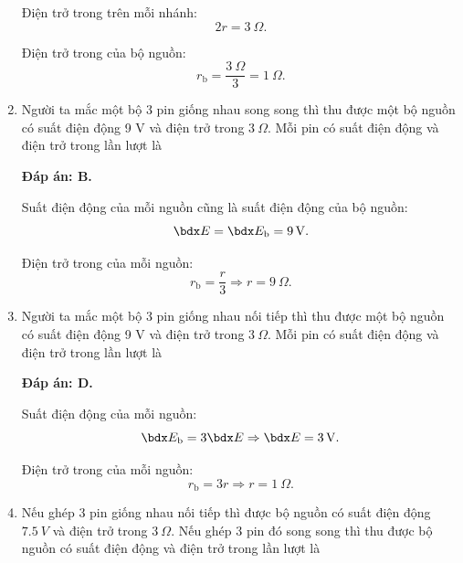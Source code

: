 \begin{enumerate}[label=\bfseries Câu \arabic*:]
{		Điện trở trong trên mỗi nhánh:
		$$2r = \SI{3}{\Omega}.$$
		
		Điện trở trong của bộ nguồn:
		$$r_\text{b} = \dfrac{\SI{3}{\Omega}}{3} = \SI{1}{\Omega}.$$
	}
	\item {}
	
	\cauhoi
	{Người ta mắc một bộ 3 pin giống nhau song song thì thu được một bộ nguồn có suất điện động 9 V và điện trở trong $\SI{3}{\Omega}$. Mỗi pin có suất điện động và điện trở trong lần lượt là
		
	}
	\loigiai
	{	\textbf{Đáp án: B.}
		
		Suất điện động của mỗi nguồn cũng là suất điện động của bộ nguồn:
		$$\calE = \calE_\text b = \SI{9}{V}.$$
		
		Điện trở trong của mỗi nguồn:
		$$r_\text{b} = \dfrac{r}{3} \Rightarrow r=\SI{9}{\Omega}.$$
	}
	\item {}
	
	\cauhoi
	{Người ta mắc một bộ 3 pin giống nhau nối tiếp thì thu được một bộ nguồn có suất điện động 9 V và điện trở trong $\SI{3}{\Omega}$. Mỗi pin có suất điện động và điện trở trong lần lượt là
		
	}
	\loigiai
	{	\textbf{Đáp án: D.}
		
		Suất điện động của mỗi nguồn:
		$$\calE_\text{b} = 3\calE \Rightarrow \calE = \SI{3}{V}.$$
		
		Điện trở trong của mỗi nguồn:
		$$r_\text{b} = 3r \Rightarrow r = \SI{1}{\Omega}.$$
	}
	\item {}
	
	\cauhoi
	{Nếu ghép 3 pin giống nhau nối tiếp thì được bộ nguồn có suất điện động $\SI{7.5}{V}$ và điện trở trong $\SI{3}{\Omega}$. Nếu ghép 3 pin đó song song thì thu được bộ nguồn có suất điện động và điện trở trong lần lượt là
		
}
\end{enumerate}
